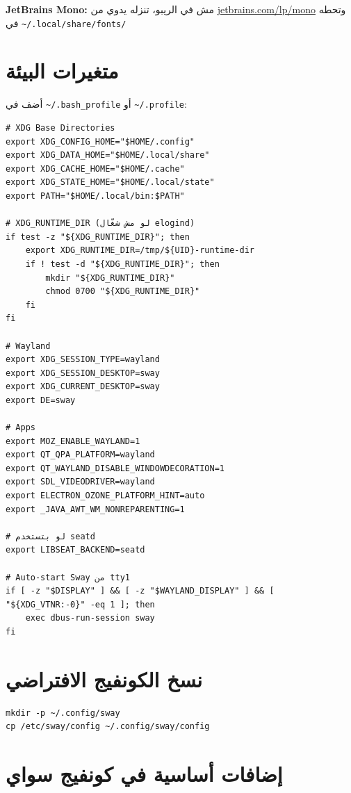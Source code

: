 \documentclass[12pt, a4paper]{report}
\newcommand{\file}[1]{\texttt{\color{warn}#1}}
\begin{document}
\begin{tcolorbox}[notebox]
\textbf{JetBrains Mono:} مش في الريبو، تنزله يدوي من \href{https://www.jetbrains.com/lp/mono/}{jetbrains.com/lp/mono} وتحطه في \texttt{\textasciitilde/.local/share/fonts/}
\end{tcolorbox}

\section{متغيرات البيئة}

أضف في \file{\textasciitilde/.bash\_profile} أو \file{\textasciitilde/.profile}:

\begin{lstlisting}
# XDG Base Directories
export XDG_CONFIG_HOME="$HOME/.config"
export XDG_DATA_HOME="$HOME/.local/share"
export XDG_CACHE_HOME="$HOME/.cache"
export XDG_STATE_HOME="$HOME/.local/state"
export PATH="$HOME/.local/bin:$PATH"

# XDG_RUNTIME_DIR (لو مش شغّال elogind)
if test -z "${XDG_RUNTIME_DIR}"; then
    export XDG_RUNTIME_DIR=/tmp/${UID}-runtime-dir
    if ! test -d "${XDG_RUNTIME_DIR}"; then
        mkdir "${XDG_RUNTIME_DIR}"
        chmod 0700 "${XDG_RUNTIME_DIR}"
    fi
fi

# Wayland
export XDG_SESSION_TYPE=wayland
export XDG_SESSION_DESKTOP=sway
export XDG_CURRENT_DESKTOP=sway
export DE=sway

# Apps
export MOZ_ENABLE_WAYLAND=1
export QT_QPA_PLATFORM=wayland
export QT_WAYLAND_DISABLE_WINDOWDECORATION=1
export SDL_VIDEODRIVER=wayland
export ELECTRON_OZONE_PLATFORM_HINT=auto
export _JAVA_AWT_WM_NONREPARENTING=1

# لو بتستخدم seatd
export LIBSEAT_BACKEND=seatd

# Auto-start Sway من tty1
if [ -z "$DISPLAY" ] && [ -z "$WAYLAND_DISPLAY" ] && [ "${XDG_VTNR:-0}" -eq 1 ]; then
    exec dbus-run-session sway
fi
\end{lstlisting}

\section{نسخ الكونفيج الافتراضي}
\begin{lstlisting}
mkdir -p ~/.config/sway
cp /etc/sway/config ~/.config/sway/config
\end{lstlisting}

\section{إضافات أساسية في كونفيج سواي}
\end{document}
